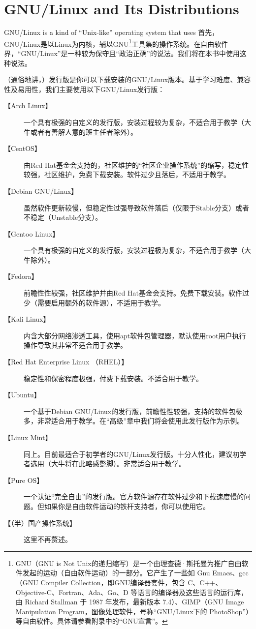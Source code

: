 \chapter{GNU/Linux and Its Distributions}
\label{sec:gnulinux} GNU/Linux is a kind of ``Unix-like'' operating system that uses 
首先，GNU/Linux是以Linux为内核，辅以GNU\footnote{GNU（GNU is Not Unix的递归缩写）是一个由理查德·斯托曼为推广自由软件发起的运动（自由软件运动）的一部分。它产生了一些如 Gnu Emacs、gcc（GNU Compiler Collection，即GNU编译器套件，包含 C、C++、Objective-C、Fortran、Ada、Go、D 等语言的编译器及这些语言的运行库，由 Richard Stallman 于 1987 年发布，最新版本 7.4）、GIMP（GNU Image Manipulation Program，图像处理软件，号称“GNU/Linux下的 PhotoShop”）等自由软件。具体请参看附录中的“GNU宣言”。}工具集的操作系统。在自由软件界，“GNU/Linux”是一种较为保守且“政治正确”的说法。我们将在本书中使用这种说法。\par
（通俗地讲，）发行版是你可以下载安装的GNU/Linux版本。基于学习难度、兼容性及易用性，我们主要使用以下GNU/Linux发行版：
\begin{description}
	\item [【Arch Linux】] 一个具有极强的自定义的发行版，安装过程较为复杂，不适合用于教学（大牛或者有善解人意的班主任者除外）。
	\item [【CentOS】] 由Red Hat基金会支持的，社区维护的“社区企业操作系统”的缩写，稳定性较强，社区维护，免费下载安装。软件过少且落后，不适用于教学。
	\item [【Debian GNU/Linux】] 虽然软件更新较慢，但稳定性过强导致软件落后（仅限于Stable分支）或者不稳定（Unstable分支）。
	\item [【Gentoo Linux】] 一个具有极强的自定义的发行版，安装过程极为复杂，不适合用于教学（大牛除外）。
	\item [【Fedora】] 前瞻性性较强，社区维护并由Red Hat基金会支持。免费下载安装。软件过少（需要启用额外的软件源），不适用于教学。
	\item [【Kali Linux】] 内含大部分网络渗透工具，使用apt软件包管理器，默认使用root用户执行操作导致其非常不适合用于教学。
	\item [【Red Hat Enterprise Linux （RHEL）】] 稳定性和保密程度极强，付费下载安装。不适合用于教学。
	\item [【Ubuntu】] 一个基于Debian GNU/Linux的发行版，前瞻性性较强，支持的软件包极多，非常适合用于教学。在“高级”章中我们将会使用此发行版作为示例。
	\item [【Linux Mint】] 同上。目前最适合于初学者的GNU/Linux发行版。十分人性化，建议初学者选用（大牛将在此略感蹩脚）。非常适合用于教学。
	\item [【Pure OS】] 一个认证“完全自由”的发行版。官方软件源存在软件过少和下载速度慢的问题。但如果你是自由软件运动的铁杆支持者，你可以使用它。
	\item [【（半）国产操作系统】]这里不再赘述。
\end{description}
